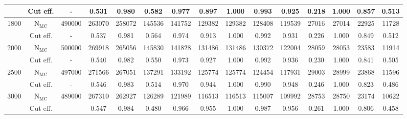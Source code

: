 \begin{table}[H]
{{\begin{tabular*}{250mm}{@{\extracolsep{\fill}}c|cccccccccccccc}
             & Cut eff.               & -      & 0.531  & 0.980   & 0.582   & 0.977     & 0.897      & 1.000    & 0.993         & 0.925                    & 0.218                     & 1.000                 & 0.857                               & 0.513\\
        \hline
        1800 & $\text{N}_{\text{MC}}$ & 490000 & 263070 & 258072  & 145536  & 141752    & 129382     & 129382   & 128408        & 119539                   & 27016                     & 27014                 & 22925                                    & 11728\\
             & Cut eff.               & -      & 0.537  & 0.981   & 0.564   & 0.974     & 0.913      & 1.000    & 0.992         & 0.931                    & 0.226                     & 1.000                 & 0.849                               & 0.512\\
        \hline
        2000 & $\text{N}_{\text{MC}}$ & 500000 & 269918 & 265056  & 145830  & 141828    & 131486     & 131486   & 130372        & 122004                   & 28059                     & 28053                 & 23583                                    & 11914\\
             & Cut eff.               & -      & 0.540  & 0.982   & 0.550   & 0.973     & 0.927      & 1.000    & 0.992         & 0.936                    & 0.230                     & 1.000                 & 0.841         
                                   & 0.505\\
        \hline
        2500 & $\text{N}_{\text{MC}}$ & 497000 & 271566 & 267051  & 137291  & 133192    & 125774     & 125774   & 124454        & 117931                   & 29003                     & 28999                 & 23868                                    & 11596\\
             & Cut eff.               & -      & 0.546  & 0.983   & 0.514   & 0.970     & 0.944      & 1.000    & 0.990         & 0.948                    & 0.246                     & 1.000                 & 0.823                               & 0.486\\
        \hline
        3000 & $\text{N}_{\text{MC}}$ & 489000 & 267310 & 262927  & 126289  & 121989    & 116513     & 116513   & 115007        & 109992                   & 28753                     & 28750                 & 23174                                    & 10622\\
             & Cut eff.               & -      & 0.547  & 0.984   & 0.480   & 0.966     & 0.955      & 1.000    & 0.987         & 0.956                    & 0.261                     & 1.000                 & 0.806         
                                   & 0.458\\ 
        \hline\hline
    \end{tabular*}
    \label{tab:CutflowForWpLH}
    }
    }\par


\end{table}
